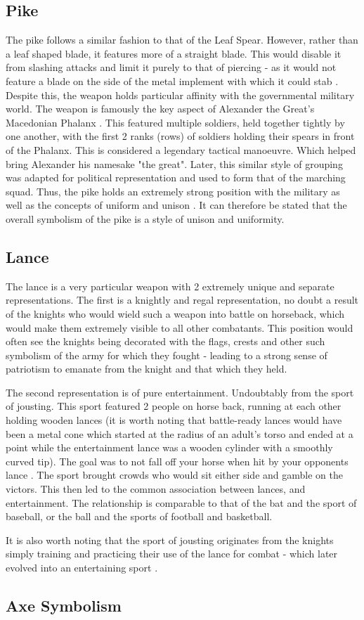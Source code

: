 \documentclass{article}
\begin{document}
\subsection*{Pike}
The pike follows a similar fashion to that of the Leaf Spear. However, rather than a leaf shaped blade, it features more of a straight blade. This would disable it from slashing attacks and limit it purely to that of piercing - as it would not feature a blade on the side of the metal implement with which it could stab \parencite{hayes1943irish}. Despite this, the weapon holds particular affinity with the governmental military world. The weapon is famously the key aspect of Alexander the Great's Macedonian Phalanx \parencite{lazenby2016phalanx}. This featured multiple soldiers, held together tightly by one another, with the first 2 ranks (rows) of soldiers holding their spears in front of the Phalanx. This is considered a legendary tactical manoeuvre. Which helped bring Alexander his namesake "the great". Later, this similar style of grouping was adapted for political representation and used to form that of the marching squad. Thus, the pike holds an extremely strong position with the military as well as the concepts of uniform and unison \parencite{bosworth2010argeads}. It can therefore be stated that the overall symbolism of the pike is a style of unison and uniformity.

\subsection*{Lance}
The lance is a very particular weapon with 2 extremely unique and separate representations. The first is a knightly and regal representation, no doubt a result of the knights who would wield such a weapon into battle on horseback, which would make them extremely visible to all other combatants. This position would often see the knights being decorated with the flags, crests and other such symbolism of the army for which they fought - leading to a strong sense of patriotism to emanate from the knight and that which they held.

The second representation is of pure entertainment. Undoubtably from the sport of jousting. This sport featured 2 people on horse back, running at each other holding wooden lances (it is worth noting that battle-ready lances would have been a metal cone which started at the radius of an adult's torso and ended at a point while the entertainment lance was a wooden cylinder with a smoothly curved tip). The goal was to not fall off your horse when hit by your opponents lance \parencite{fallows2010jousting}. The sport brought crowds who would sit either side and gamble on the victors. This then led to the common association between lances, and entertainment. The relationship is comparable to that of the bat and the sport of baseball, or the ball and the sports of football and basketball.

It is also worth noting that the sport of jousting originates from the knights simply training and practicing their use of the lance for combat - which later evolved into an entertaining sport \parencite{smith2017lance}. 

\subsection{Axe Symbolism} \label{axeSymbol}
\pagebreak


\printbibliography
\end{document}
